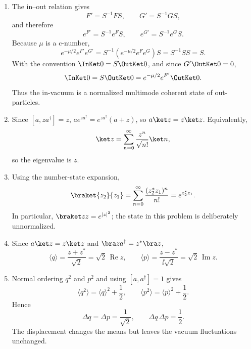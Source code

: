 \begin{enumerate}
\begin{enumerate}
\item
The in--out relation gives
\[
 F'=S^{-1}FS,\qquad G'=S^{-1}GS,
\]
and therefore
\[
 e^{F'}=S^{-1}e^FS,\qquad e^{G'}=S^{-1}e^GS.
\]
Because \(\mu\) is a c-number,
\[
 e^{-\mu/2}e^{F'}e^{G'}
 =S^{-1}\!\left(e^{-\mu/2}e^Fe^G\right)S
 =S^{-1}SS=S.
\]
With the convention \(\InKet0=S\OutKet0\), and since
\(G'\OutKet0=0\),
\[
 \InKet0=S\OutKet0
 =e^{-\mu/2}e^{F'}\OutKet0.
\]
Thus the in-vacuum is a normalized multimode coherent state of
out-particles.
\item
Since \([a,za^\dagger]=z\),
\(ae^{za^\dagger}=e^{za^\dagger}(a+z)\), so
\(a\ket z=z\ket z\).  Equivalently,
\[
 \ket z=\sum_{n=0}^{\infty}\frac{z^n}{\sqrt{n!}}\ket n,
\]
so the eigenvalue is \(z\).
\item
Using the number-state expansion,
\[
 \braket{z_2}{z_1}
 =\sum_{n=0}^\infty\frac{(z_2^*z_1)^n}{n!}
 =e^{z_2^*z_1}.
\]
In particular, \(\braket z z=e^{|z|^2}\); the state in this problem is
deliberately unnormalized.
\item
Since \(a\ket z=z\ket z\) and \(\bra z a^\dagger=z^*\bra z\),
\[
 \langle q\rangle=\frac{z+z^*}{\sqrt2}
 =\sqrt2\,\operatorname{Re}z,\qquad
 \langle p\rangle=\frac{z-z^*}{\ii\sqrt2}
 =\sqrt2\,\operatorname{Im}z.
\]
\item
Normal ordering \(q^2\) and \(p^2\) and using
\([a,a^\dagger]=1\) gives
\[
 \langle q^2\rangle=\langle q\rangle^2+\frac12,\qquad
 \langle p^2\rangle=\langle p\rangle^2+\frac12.
\]
Hence
\[
 \Delta q=\Delta p=\frac1{\sqrt2},\qquad
 \Delta q\,\Delta p=\frac12.
\]
The displacement changes the means but leaves the vacuum fluctuations
unchanged.
\end{enumerate}


\end{enumerate}
